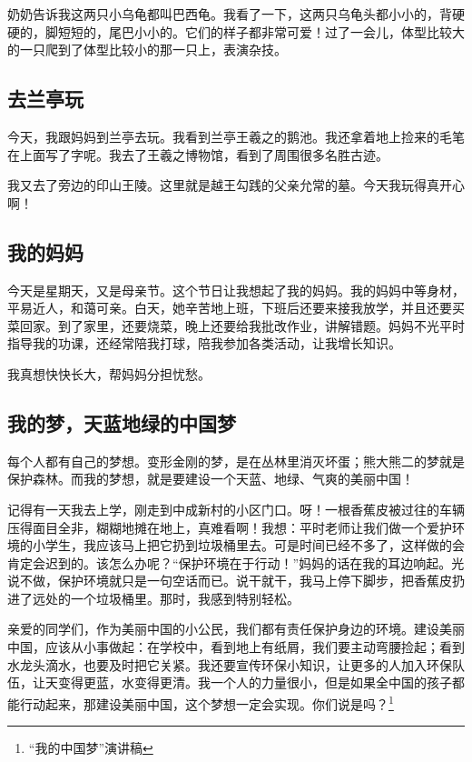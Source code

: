 \documentclass[UTF8,a4paper,titlepage,twoside,10.5pt]{article}
\begin{document}
奶奶告诉我这两只小乌龟都叫巴西龟。我看了一下，这两只乌龟头都小小的，背硬硬的，脚短短的，尾巴小小的。它们的样子都非常可爱！过了一会儿，体型比较大的一只爬到了体型比较小的那一只上，表演杂技。

\subsection{去兰亭玩}
\label{sec:orgcbed246}

今天，我跟妈妈到兰亭去玩。我看到兰亭王羲之的鹅池。我还拿着地上捡来的毛笔在上面写了字呢。我去了王羲之博物馆，看到了周围很多名胜古迹。

我又去了旁边的印山王陵。这里就是越王勾践的父亲允常的墓。今天我玩得真开心啊！

\subsection{我的妈妈}
\label{sec:org80bd4d2}

今天是星期天，又是母亲节。这个节日让我想起了我的妈妈。我的妈妈中等身材，平易近人，和蔼可亲。白天，她辛苦地上班，下班后还要来接我放学，并且还要买菜回家。到了家里，还要烧菜，晚上还要给我批改作业，讲解错题。妈妈不光平时指导我的功课，还经常陪我打球，陪我参加各类活动，让我增长知识。

我真想快快长大，帮妈妈分担忧愁。

\subsection{我的梦，天蓝地绿的中国梦}
\label{sec:org2f1ab62}

每个人都有自己的梦想。变形金刚的梦，是在丛林里消灭坏蛋；熊大熊二的梦就是保护森林。而我的梦想，就是要建设一个天蓝、地绿、气爽的美丽中国！

记得有一天我去上学，刚走到中成新村的小区门口。呀！一根香蕉皮被过往的车辆压得面目全非，糊糊地摊在地上，真难看啊！我想：平时老师让我们做一个爱护环境的小学生，我应该马上把它扔到垃圾桶里去。可是时间已经不多了，这样做的会肯定会迟到的。该怎么办呢？“保护环境在于行动！”妈妈的话在我的耳边响起。光说不做，保护环境就只是一句空话而已。说干就干，我马上停下脚步，把香蕉皮扔进了远处的一个垃圾桶里。那时，我感到特别轻松。

亲爱的同学们，作为美丽中国的小公民，我们都有责任保护身边的环境。建设美丽中国，应该从小事做起：在学校中，看到地上有纸屑，我们要主动弯腰捡起；看到水龙头滴水，也要及时把它关紧。我还要宣传环保小知识，让更多的人加入环保队伍，让天变得更蓝，水变得更清。我一个人的力量很小，但是如果全中国的孩子都能行动起来，那建设美丽中国，这个梦想一定会实现。你们说是吗？\footnote{“我的中国梦”演讲稿}
\end{document}

